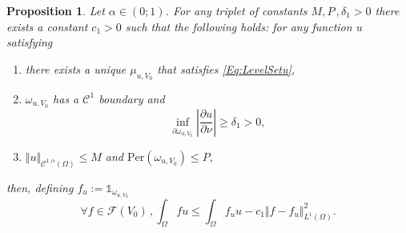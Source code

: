 \documentclass{article}
\renewcommand{\geq}{\geqslant}
\renewcommand{\leq}{\leqslant}
\newtheorem{proposition}[material]{Proposition}
\def\O{{\Omega}}
\numberwithin{equation}{section}
\begin{document}
\begin{proposition} \cite[Proposition 26]{MRB2020} \label{Pr:QuantitativeBathtub} Let $\alpha \in (0;1)$. For any triplet of constants $M,P\,, \delta_1>0$ there exists a constant $c_1>0$ such that the following holds: for any function $u$ satisfying
\begin{enumerate}
\item there exists a unique $\mu_{u,V_0}$ that satisfies \eqref{Eq:LevelSetu},
\item $\omega_{u,V_0}$ has a $\mathscr C^1$ boundary and 
\[ \inf_{\partial \omega_{u,V_0}}\left|\frac{\partial u}{\partial \nu}\right|\geq \delta_1>0,\]
\item $\Vert u\Vert_{\mathscr C^{1,\alpha}(\O)}\leq M$ and $\mathrm{Per}(\omega_{u,V_0})\leq P,$
\end{enumerate}
then, defining $f_u:=\mathds 1_{\omega_{u,V_0}}$
\begin{equation}\forall f \in \mathcal F(V_0)\,, \int_\O f u\leq \int_\O f_u u-c_1 \Vert f-f_u\Vert_{L^1(\O)}^2.\end{equation}
\end{proposition} 
\end{document}
